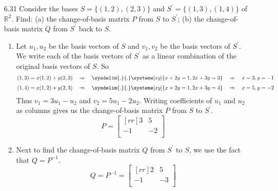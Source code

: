 \documentclass[12pt]{article}
\theoremstyle{definition}
\theoremstyle{plain}
\begin{document}
\begin{enumerate}
\item[6.31] Consider the bases $S=\{(1,2),(2,3)\}$ and $S^\prime=\{(1,3),(1,4)\}$ of $\mathbb{R}^2$. Find: (a) the change-of-basis matrix $P$ from $S$ to $S^\prime$; (b) the change-of-basis matrix $Q$ from $S^\prime$ back to $S$.
	\begin{enumerate}
	\item Let $u_1,u_2$ be the basis vectors of $S$ and $v_1,v_2$ be the basis vectors of $S^\prime$. We write each of the basis vectors of $S^\prime$ as a linear combination of the original basis vectors of $S$. So
	\[ (1,3)=x(1,2)+y(2,3)\quad\Rightarrow\quad\sysdelim{.}{.}\systeme[xy]{x+2y=1,2x+3y=3}\quad\Rightarrow\quad x=3, y=-1 \]
	\[ (1,4)=x(1,2)+y(2,3)\quad\Rightarrow\quad\sysdelim{.}{.}\systeme[xy]{x+2y=1,2x+3y=4} \quad\Rightarrow\quad x=5,y=-2 \]
	Thus $v_1=3u_1-u_2$ and $v_2=5u_1-2u_2$. Writing coefficients of $u_1$ and $u_2$ as columns gives us the change-of-basis matrix $P$ from $S$ to $S^\prime$.
	\[ P = \begin{bmatrix}[rr]3&5\\-1&-2\\\end{bmatrix} \]
	\item Next to find the change-of-basis matrix $Q$ from $S^\prime$ to $S$, we use the fact that $Q=P^{-1}$.
	\[ Q = P^{-1} = \begin{bmatrix}[rr]2&5\\-1&-3\\\end{bmatrix} \]
	\end{enumerate}
	

\end{enumerate}
\end{document}
